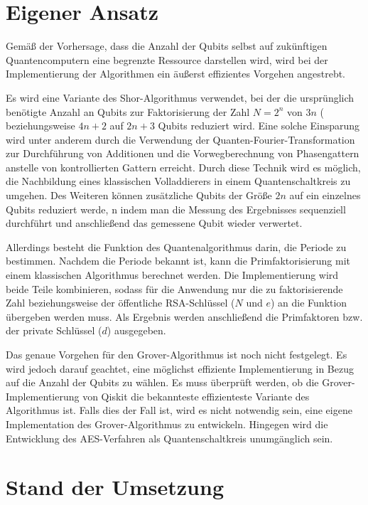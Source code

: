 \documentclass[
  a4paper, %
  10pt, %
  unnumberedsections, %
  twoside, %
]{LTJournalArticle}
\begin{document}
\section{Eigener Ansatz}

Gemäß der Vorhersage, dass die Anzahl der Qubits
selbst auf zukünftigen Quantencomputern eine begrenzte Ressource darstellen wird\autocite{zalka1998fast},
wird bei der Implementierung der Algorithmen ein äußerst effizientes Vorgehen angestrebt.

Es wird eine Variante des Shor-Algorithmus verwendet,
bei der die ursprünglich benötigte Anzahl an Qubits zur Faktorisierung der Zahl
$N = 2^{n}$ von $3n$ (\autocite{zalka1998fast} beziehungsweise
$4n+2$\autocite{IBM:Shor_docu} auf $2n+3$ Qubits reduziert wird\autocite{beauregard2003circuit}.
Eine solche Einsparung wird unter anderem durch
die Verwendung der Quanten-Fourier-Transformation zur Durchführung von Additionen und
die Vorwegberechnung von Phasengattern anstelle von kontrollierten Gattern erreicht.
Durch diese Technik wird es möglich,
die Nachbildung eines klassischen Volladdierers in einem Quantenschaltkreis zu umgehen\autocite{draper2000addition}.
Des Weiteren können zusätzliche Qubits der Größe $2n$ auf ein einzelnes Qubits reduziert werde,
n indem man die Messung des Ergebnisses sequenziell durchführt und anschließend das gemessene Qubit wieder verwertet\autocite{Parker_2000}.

Allerdings besteht die Funktion des Quantenalgorithmus darin,
die Periode zu bestimmen.
Nachdem die Periode bekannt ist,
kann die Primfaktorisierung mit einem klassischen Algorithmus berechnet werden.
Die Implementierung wird beide Teile kombinieren,
sodass für die Anwendung nur die zu faktorisierende Zahl beziehungsweise
der öffentliche RSA-Schlüssel ($N$ und $e$) an die Funktion übergeben werden muss.
Als Ergebnis werden anschließend die Primfaktoren bzw. der private Schlüssel ($d$) ausgegeben.

Das genaue Vorgehen für den Grover-Algorithmus ist noch nicht festgelegt.
Es wird jedoch darauf geachtet, eine möglichst effiziente Implementierung in Bezug auf die Anzahl der Qubits zu wählen.
Es muss überprüft werden, ob die Grover-Implementierung von Qiskit die bekannteste effizienteste Variante des Algorithmus ist.
Falls dies der Fall ist, wird es nicht notwendig sein,
eine eigene Implementation des Grover-Algorithmus zu entwickeln.
Hingegen wird die Entwicklung des AES-Verfahren als Quantenschaltkreis unumgänglich sein.

\section{\LARGE Stand der Umsetzung}
\end{document}
